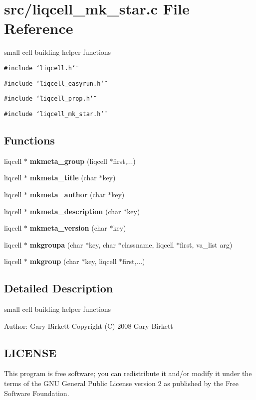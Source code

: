 \section{src/liqcell\_\-mk\_\-star.c File Reference}
\label{d4/d54/liqcell__mk__star_8c}
small cell building helper functions  


{\tt \#include \char`\"{}liqcell.h\char`\"{}}\par
{\tt \#include \char`\"{}liqcell\_\-easyrun.h\char`\"{}}\par
{\tt \#include \char`\"{}liqcell\_\-prop.h\char`\"{}}\par
{\tt \#include \char`\"{}liqcell\_\-mk\_\-star.h\char`\"{}}\par
\subsection*{Functions}
\begin{CompactItemize}
\item 
liqcell $\ast$ {\bf mkmeta\_\-group} (liqcell $\ast$first,...)
\item 
liqcell $\ast$ {\bf mkmeta\_\-title} (char $\ast$key)
\item 
liqcell $\ast$ {\bf mkmeta\_\-author} (char $\ast$key)
\item 
liqcell $\ast$ {\bf mkmeta\_\-description} (char $\ast$key)
\item 
liqcell $\ast$ {\bf mkmeta\_\-version} (char $\ast$key)
\item 
liqcell $\ast$ {\bf mkgroupa} (char $\ast$key, char $\ast$classname, liqcell $\ast$first, va\_\-list arg)
\item 
liqcell $\ast$ {\bf mkgroup} (char $\ast$key, liqcell $\ast$first,...)
\end{CompactItemize}


\label{_details}
\subsection{Detailed Description}
small cell building helper functions 

\begin{Desc}
\item[Author:]Gary Birkett Copyright (C) 2008 Gary Birkett\end{Desc}
\subsection{LICENSE}\label{d7/db4/liqcell__prop_8c_LICENSE}
This program is free software; you can redistribute it and/or modify it under the terms of the GNU General Public License version 2 as published by the Free Software Foundation.

